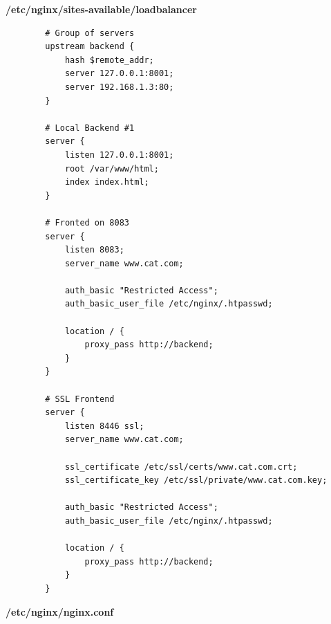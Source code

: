 \documentclass[14pt, a4paper]{extreport}
\begin{document}
	\textbf{/etc/nginx/sites-available/loadbalancer}
	
	\begin{verbatim} 
		# Group of servers
		upstream backend {
			hash $remote_addr;
			server 127.0.0.1:8001;
			server 192.168.1.3:80;
		}
		
		# Local Backend #1
		server {
			listen 127.0.0.1:8001;
			root /var/www/html;
			index index.html;
		}
		
		# Fronted on 8083
		server {
			listen 8083;
			server_name www.cat.com;
			
			auth_basic "Restricted Access";
			auth_basic_user_file /etc/nginx/.htpasswd;
			
			location / {
				proxy_pass http://backend;
			}
		}
		
		# SSL Frontend
		server {
			listen 8446 ssl;
			server_name www.cat.com;
			
			ssl_certificate /etc/ssl/certs/www.cat.com.crt;
			ssl_certificate_key /etc/ssl/private/www.cat.com.key;
			
			auth_basic "Restricted Access";
			auth_basic_user_file /etc/nginx/.htpasswd;
			
			location / {
				proxy_pass http://backend;
			}
		}
	\end{verbatim}
	
	\textbf{/etc/nginx/nginx.conf}
	
\end{document}
